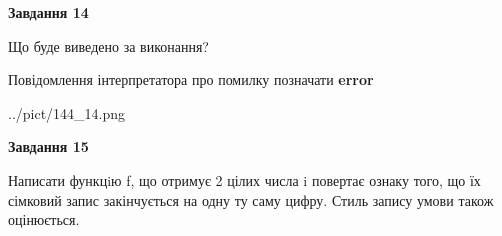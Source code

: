 \documentclass[11pt, ukrainian]{article}
\begin{document}
{\begin {large}
{\begin {center}\textbf{Завдання 14}\end {center}}\par
Що буде виведено за виконання? \par
Повідомлення інтерпретатора про помилку позначати \textbf{error}

\begin{center}
	{../pict/144_14.png}
\end{center}
\newpage

{\begin {center}\textbf{Завдання 15}\end {center}}\par

Написати функцiю f, що отримує 2 цілих числа i повертає ознаку того, що їх сімковий запис закінчується на одну ту саму цифру. Стиль запису умови також оцінюється.\par
\newpage

\end {large}}
\end{document}
